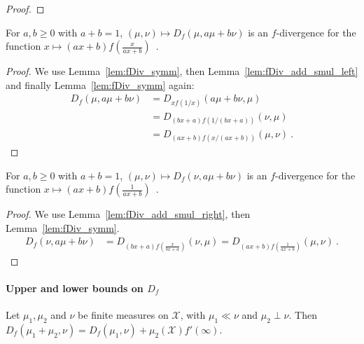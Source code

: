 \begin{proof}\leanok
\uses{}
\end{proof}


\begin{lemma}
  \label{lem:fDiv_add_smul_right}
  \leanok
  For $a, b \ge 0$ with $a + b = 1$, $(\mu, \nu) \mapsto D_f(\mu, a \mu + b \nu)$ is an $f$-divergence for the function $x \mapsto (ax+b)f\left(\frac{x}{ax+b}\right)$~.
\end{lemma}

\begin{proof}\leanok
{}
We use Lemma~\ref{lem:fDiv_symm}, then Lemma~\ref{lem:fDiv_add_smul_left} and finally Lemma~\ref{lem:fDiv_symm} again:
\begin{align*}
D_f(\mu, a \mu + b \nu)
&= D_{xf(1/x)}(a \mu + b \nu, \mu)
\\
&= D_{(bx+a)f(1/(bx+a))}(\nu, \mu)
\\
&= D_{(ax+b)f(x/(ax+b))}(\mu, \nu)
\: .
\end{align*}

\end{proof}


\begin{lemma}
  \label{lem:fDiv_add_smul_right'}
  \leanok
  For $a, b \ge 0$ with $a + b = 1$, $(\mu, \nu) \mapsto D_f(\nu, a \mu + b \nu)$ is an $f$-divergence for the function $x \mapsto (ax+b)f\left(\frac{1}{ax+b}\right)$~.
\end{lemma}

\begin{proof}\leanok
{}
We use Lemma~\ref{lem:fDiv_add_smul_right}, then Lemma~\ref{lem:fDiv_symm}.
\begin{align*}
D_f(\nu, a \mu + b \nu)
&= D_{(bx+a)f\left(\frac{x}{bx+a}\right)}(\nu, \mu)
= D_{(ax+b)f\left(\frac{1}{ax+b}\right)}(\mu, \nu)
\: .
\end{align*}
\end{proof}



\paragraph{Upper and lower bounds on $D_f$}

\begin{lemma}
  \label{lem:fDiv_absolutelyContinuous_add_mutuallySingular}
  \leanok
  Let $\mu_1, \mu_2$ and $\nu$ be finite measures on $\mathcal X$, with $\mu_1 \ll \nu$ and $\mu_2 \perp \nu$.
  Then $D_f(\mu_1 + \mu_2, \nu) = D_f(\mu_1, \nu) + \mu_2(\mathcal X) f'(\infty)$.
\end{lemma}

